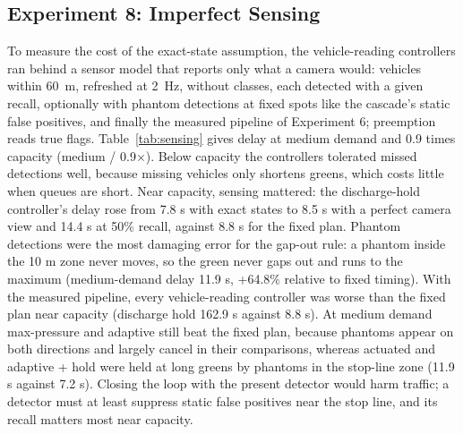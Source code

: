 \subsection{Experiment 8: Imperfect Sensing}
To measure the cost of the exact-state assumption, the vehicle-reading controllers ran behind a sensor model that reports only what a camera would: vehicles within 60~m, refreshed at 2~Hz, without classes, each detected with a given recall, optionally with phantom detections at fixed spots like the cascade's static false positives, and finally the measured pipeline of Experiment 6; preemption reads true flags. Table~\ref{tab:sensing} gives delay at medium demand and 0.9 times capacity (medium / 0.9$\times$). Below capacity the controllers tolerated missed detections well, because missing vehicles only shortens greens, which costs little when queues are short. Near capacity, sensing mattered: the discharge-hold controller's delay rose from 7.8 s with exact states to 8.5 s with a perfect camera view and 14.4 s at 50\% recall, against 8.8 s for the fixed plan. Phantom detections were the most damaging error for the gap-out rule: a phantom inside the 10 m zone never moves, so the green never gaps out and runs to the maximum (medium-demand delay 11.9 s, +64.8\% relative to fixed timing). With the measured pipeline, every vehicle-reading controller was worse than the fixed plan near capacity (discharge hold 162.9 s against 8.8 s). At medium demand max-pressure and adaptive still beat the fixed plan, because phantoms appear on both directions and largely cancel in their comparisons, whereas actuated and adaptive + hold were held at long greens by phantoms in the stop-line zone (11.9 s against 7.2 s). Closing the loop with the present detector would harm traffic; a detector must at least suppress static false positives near the stop line, and its recall matters most near capacity.

